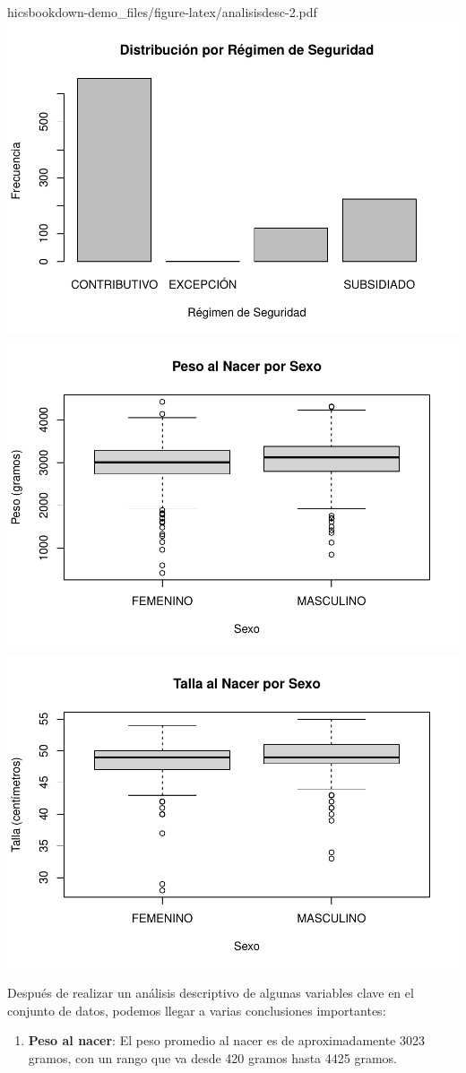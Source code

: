 \documentclass[
]{book}
\begin{document}
hics{bookdown-demo_files/figure-latex/analisisdesc-2.pdf} \includegraphics{bookdown-demo_files/figure-latex/analisisdesc-3.pdf} \includegraphics{bookdown-demo_files/figure-latex/analisisdesc-4.pdf} \includegraphics{bookdown-demo_files/figure-latex/analisisdesc-5.pdf}

Después de realizar un análisis descriptivo de algunas variables clave en el conjunto de datos, podemos llegar a varias conclusiones importantes:

\begin{enumerate}
\def\labelenumi{\arabic{enumi}.}
\item
  \textbf{Peso al nacer}: El peso promedio al nacer es de aproximadamente 3023 gramos, con un rango que va desde 420 gramos hasta 4425 gramos. 
\end{enumerate}
\end{document}
